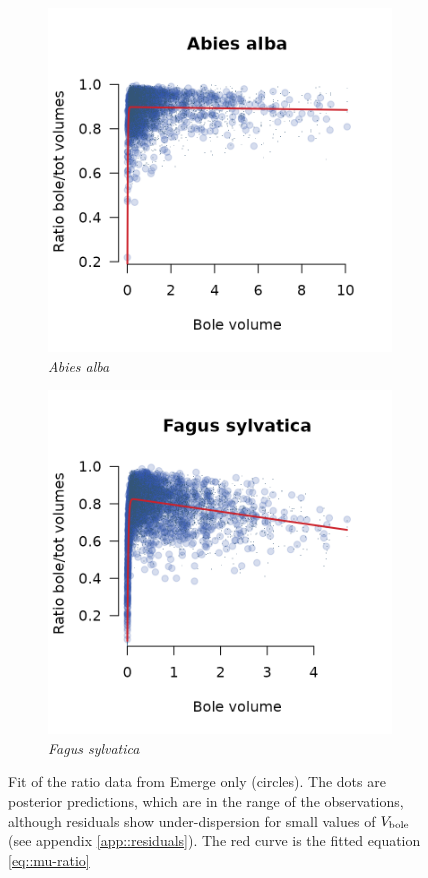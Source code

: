 \begin{figure}[htb]
	\centering
	\begin{subfigure}{0.4\textwidth}
		\includegraphics{./Figures/abiesAlba.png}
		\caption{\textit{Abies alba}}
	\end{subfigure}
	\hfil
	\begin{subfigure}{0.4\textwidth}
		\includegraphics{./Figures/fagSyl.png}
		\caption{\textit{Fagus sylvatica}}
	\end{subfigure}
	\caption{Fit of the ratio data from Emerge only (circles). The dots are posterior predictions, which are in the range of the observations, although residuals show under-dispersion for small values of \( V_{\text{bole}} \) (see appendix \ref{app::residuals}). The red curve is the fitted equation \eqref{eq::mu-ratio}}
	\label{fig::res-mu-ratio}
\end{figure}

